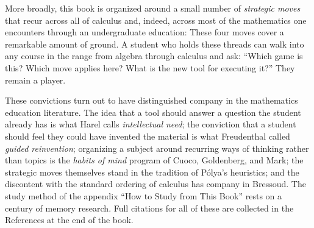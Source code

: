 More broadly, this book is organized around a small number of 
{\it strategic moves\/} that recur across all of calculus and, 
indeed, across most of the mathematics one encounters through 
an undergraduate education:
\beginEnum
{}
\endEnum
\medskip
\noindent These four moves cover a remarkable amount of ground. A student
who holds these threads can walk into any course in the range from
algebra through calculus and ask: ``Which game is this? Which move
applies here? What is the new tool for executing it?''
They remain a player.

These convictions turn out to have distinguished company in the
mathematics education literature. The idea that a tool should answer a
question the student already has is what Harel calls {\it intellectual
need\/}; the conviction that a student should feel they could have
invented the material is what Freudenthal called {\it guided
reinvention\/}; organizing a subject around recurring ways of thinking
rather than topics is the {\it habits of mind\/} program of Cuoco,
Goldenberg, and Mark; the strategic moves themselves stand in the
tradition of P\'olya's heuristics; and the discontent with the standard
ordering of calculus has company in Bressoud. The study method of the
appendix ``How to Study from This Book'' rests on a century of memory research. Full citations for
all of these are collected in the References at the end of the book.

